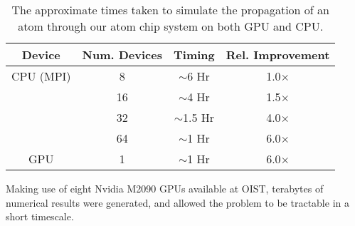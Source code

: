 \begin{table}[tb]
  \begin{center}
    \begin{tabular}{|c||c|c|c|}
      \hline
      Device & Num. Devices & Timing  & Rel. Improvement \\ \hline
      CPU (MPI) & 8 & $\sim$6 Hr & 1.0$\times$ \\
      & 16 & $\sim$4 Hr & 1.5$\times$ \\
      & 32 & $\sim$1.5 Hr & 4.0$\times$ \\
      & 64 & $\sim$1 Hr & 6.0$\times$ \\ \hline
      GPU & 1 & $\sim$1 Hr & 6.0$\times$ \\ \hline
    \end{tabular}
  \end{center}
   \caption{The approximate times taken to simulate the propagation of an atom through our atom chip system on both GPU and CPU.}
   \label{tbl:timing}
\end{table}

Making use of eight Nvidia M2090 GPUs available at OIST, terabytes of numerical results were generated, and allowed the problem to be tractable in a short timescale.
